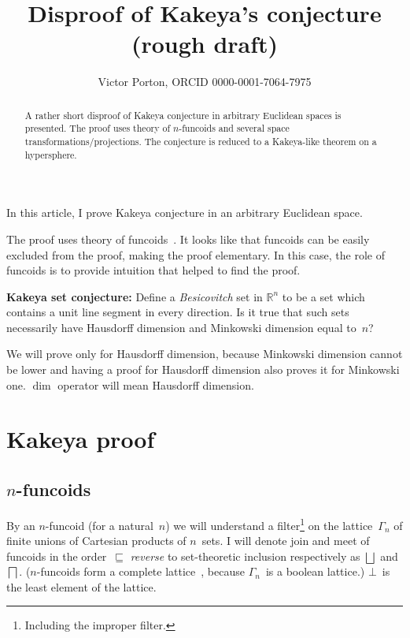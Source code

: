 \documentclass[oneside,draft]{amsart}
\title{Disproof of Kakeya's conjecture (rough draft)}
\author{Victor Porton, ORCID 0000-0001-7064-7975}
\begin{document}
\begin{abstract}
A rather short disproof of Kakeya conjecture in arbitrary Euclidean spaces is presented. The proof uses theory of $n$-fun\-co\-ids and several space transformations/projections. The conjecture is reduced to a Ka\-ke\-ya-li\-ke theorem on a hypersphere.
\end{abstract}

\maketitle  

In this article, I prove Kakeya conjecture in an arbitrary Euclidean space.

The proof uses theory of funcoids~\cite{volume-1}. It looks like that funcoids can be easily excluded from the proof, making the proof elementary. In this case, the role of funcoids is to provide intuition that helped to find the proof.

\textbf{Kakeya set conjecture:} \cite{kakeya-long,tao-blog-kakeya} Define a \emph{Besicovitch} set in $\mathbb{R}^n$ to be a set which contains a unit line segment in every direction. Is it true that such sets necessarily have Hausdorff dimension and Minkowski dimension equal to~$n$?

We will prove only for Hausdorff dimension, because Minkowski dimension cannot be lower and having a proof for Hausdorff dimension also proves it for Minkowski one. $\dim$ operator will mean Hausdorff dimension.

\section{Kakeya proof}

\subsection{$n$-fun\-co\-ids}

By an $n$-fun\-co\-id (for a natural~$n$) we will understand a filter\footnote{Including the improper filter.} on the lattice~$\Gamma_n$ of finite unions of Cartesian products of $n$~sets. I will denote join and meet of funcoids in the order~$\sqsubseteq$ \emph{reverse} to set-the\-o\-re\-tic inclusion respectively as $\bigsqcup$ and $\bigsqcap$. ($n$-fun\-co\-ids form a complete lattice~\cite{volume-1}, because $\Gamma_n$~is a boolean lattice.) $\bot$~is the least element of the lattice.
\end{document}
